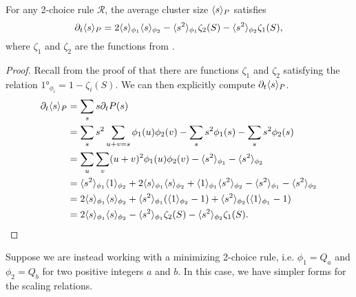\documentclass[twoside,10pt]{article}
\begin{document}
\begin{cor}
	For any 2-choice rule $\mathcal{R}$, the average cluster size $\langle s \rangle_{P}$ satisfies
\[
        \partial_{t}{\langle s \rangle_{P}} = 2\langle s \rangle_{\phi_1}\langle s \rangle_{\phi_2} - \langle s^2 \rangle_{\phi_1}\zeta_2(S) - \langle s^2 \rangle_{\phi_2}\zeta_1(S),
\]
where $\zeta_1$ and $\zeta_2$ are the functions from .
\end{cor}
\begin{proof}
	Recall from the proof of  that there are functions $\zeta_1$ and $\zeta_2$ satisfying the relation $\ang{1}_{\phi_i} = 1-\zeta_i(S)$. We can then explicitly compute $\partial_{t}{\langle s \rangle_{P}} $.
        \begin{align*}
                \partial_{t}{\langle s \rangle_{P}} &= \sum_s s \partial_{t}{P(s)} \\
                                    &= \sum_s s^2 \sum_{u+v=s}\phi_1(u)\phi_2(v) - \sum_s s^2 \phi_1(s) - \sum_s s^2 \phi_2(s) \\
                                    &= \sum_{u}\sum_{v} (u+v)^2\phi_1(u) \phi_2(v) - \langle s^2 \rangle_{\phi_1}-\langle s^2 \rangle_{\phi_2} \\
                                    &= \langle s^2 \rangle_{\phi_1}\langle 1 \rangle_{\phi_2} + 2\langle s \rangle_{\phi_1}\langle s \rangle_{\phi_2} + \langle 1 \rangle_{\phi_1}\langle s^2 \rangle_{\phi_2}- \langle s^2 \rangle_{\phi_1}-\langle s^2 \rangle_{\phi_2} \\
                                    &= 2\langle s \rangle_{\phi_1}\langle s \rangle_{\phi_2} + \langle s^2 \rangle_{\phi_1}(\langle 1 \rangle_{\phi_2} - 1) + \langle s^2 \rangle_{\phi_2}(\langle 1 \rangle_{\phi_1}-1) \\
                                    &= 2\langle s \rangle_{\phi_1}\langle s \rangle_{\phi_2} - \langle s^2 \rangle_{\phi_1}\zeta_2(S) - \langle s^2 \rangle_{\phi_2}\zeta_1(S).
        \end{align*}
\end{proof}

\begin{thrm}[]
	\label{2c-scaling-relations}
\end{thrm}

Suppose we are instead working with a minimizing 2-choice rule, i.e. $\phi_1=Q_{a}$ and $\phi_2=Q_{b}$ for two positive integers $a$ and $b$. In this case, we have simpler forms for the scaling relations.
\end{document}

